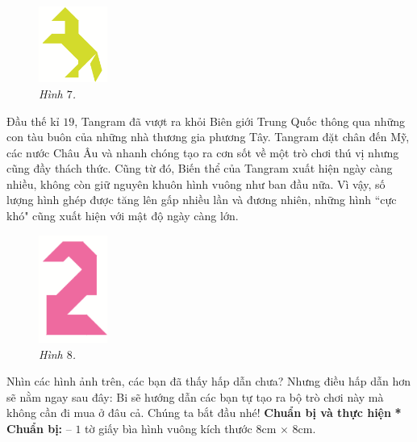 	\begin{multicols}{2}
		\begin{figure}[H]
			\vspace*{5pt}	
			\captionsetup{labelformat=empty}
			\centering
			\captionsetup{justification=raggedleft}
			\includegraphics[width =0.2\textwidth]{image7}
			\caption{\small\it Hình $7$.}
			\vspace*{-10pt}
		\end{figure}
		Đầu thế kỉ $19$, Tangram đã vượt ra khỏi Biên giới Trung Quốc thông qua những con tàu buôn của những nhà thương gia phương Tây. \linebreak Tangram đặt chân đến Mỹ, các nước Châu Âu và nhanh chóng tạo ra cơn sốt về một trò chơi thú vị nhưng cũng đầy thách thức. Cũng từ đó, Biến thể của
		Tangram xuất hiện ngày càng nhiều, không còn giữ nguyên khuôn hình vuông như ban đầu nữa. Vì vậy, số lượng hình ghép được tăng lên gấp nhiều lần và đương nhiên, những hình ``cực khó" cũng xuất hiện với mật độ ngày càng lớn.
		\begin{figure}[H]
			\vspace*{-10pt}	
			\captionsetup{labelformat=empty}
			\centering
			\captionsetup{justification=raggedleft}
			\includegraphics[width =0.2\textwidth]{image8}
			\caption{\small\it Hình $8$.}
		\end{figure}
		Nhìn các hình ảnh trên, các bạn đã thấy hấp dẫn chưa? Nhưng điều hấp dẫn hơn sẽ nằm ngay sau đây: Bi sẽ hướng dẫn các bạn tự tạo ra bộ trò chơi này mà không cần đi mua ở đâu cả. Chúng ta bắt đầu nhé!
	\vskip 0.1cm
	\textbf{\color{toancuabi}Chuẩn bị và thực hiện}
	\vskip 0.1cm
	\textbf{\color{toancuabi}* Chuẩn bị:}
	\vskip 0.1cm
	-- $1$ tờ giấy bìa hình vuông kích thước $8$cm $\times$ $8$cm.

\end{multicols}
